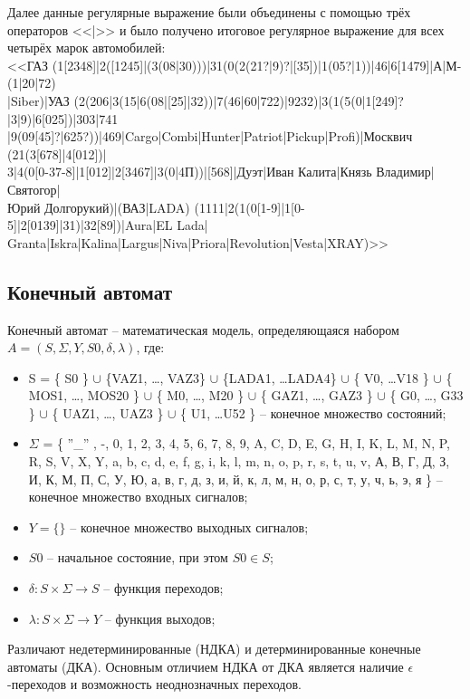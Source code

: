 \documentclass[a4paper,final]{article}
\begin{document}
Далее данные регулярные выражение были объединены с помощью трёх операторов <<|>> и было получено итоговое регулярное выражение для всех четырёх марок автомобилей:\\[0.7em]
<<ГАЗ (1[2348]|2([1245]|(3(08|30)))|31(0(2(21?|9)?|[35])|1(05?|1))|46|6[1479]|А|М-(1|20|72)\\|Siber)|УАЗ (2(206|3(15|6(08|[25]|32))|7(46|60|722)|9232)|3(1(5(0|1[249]?|3|9)|6[025])|303|741\\|9(09[45]?|625?))|469|Cargo|Combi|Hunter|Patriot|Pickup|Profi)|Москвич (21(3[678]|4[012])|\\3|4(0[0-37-8]|1[012]|2[3467]|3(0|4П))|[568]|Дуэт|Иван Калита|Князь Владимир|Святогор|\\Юрий Долгорукий)|(ВАЗ|LADA) (1111|2(1(0[1-9]|1[0-5]|2[0139]|31)|32[89])|Aura|EL Lada|\\Granta|Iskra|Kalina|Largus|Niva|Priora|Revolution|Vesta|XRAY)>>

\subsection{Конечный автомат}
Конечный автомат -- математическая модель, определяющаяся набором $A = (S, \Sigma, Y, S0, \delta, \lambda)$, где:
\begin{itemize}
    \item S = \{ S0 \} $\cup$ \{VAZ1, \dots, VAZ3\} $\cup$ \{LADA1, \dots LADA4\} $\cup$ \{ V0, \dots V18 \} $\cup$ \{ MOS1, \dots, MOS20 \} $\cup$ \{ M0, \dots, M20 \} $\cup$ \{ GAZ1, \dots, GAZ3 \} $\cup$ \{ G0, \dots, G33 \} $\cup$ \{ UAZ1, \dots, UAZ3 \} $\cup$ \{ U1, \dots U52 \} -- конечное множество состояний;
    \item $\Sigma$ = \{ ''\_'' , -, 0, 1, 2, 3, 4, 5, 6, 7, 8, 9, A, C, D, E, G, H, I, K, L, M, N, P, R, S, V, X, Y, a, b, c, d, e, f, g, i, k, l, m, n, o, p, r, s, t, u, v, А, В, Г, Д, З, И, К, М, П, С, У, Ю, а, в, г, д, з, и, й, к, л, м, н, о, р, с, т, у, ч, ь, э, я \} -- конечное множество входных сигналов;
    \item $Y = \{  \}$ -- конечное множество выходных сигналов;
    \item $S0$ -- начальное состояние, при этом $S0 \in S$;
    \item $\delta : S \times \Sigma \rightarrow S$ -- функция переходов;
    \item $\lambda: S \times \Sigma \rightarrow Y$ -- функция выходов;
\end{itemize}

Различают недетерминированные (НДКА) и детерминированные конечные автоматы (ДКА). Основным отличием НДКА от ДКА является наличие $\epsilon$-переходов и возможность неоднозначных переходов.
\end{document}
